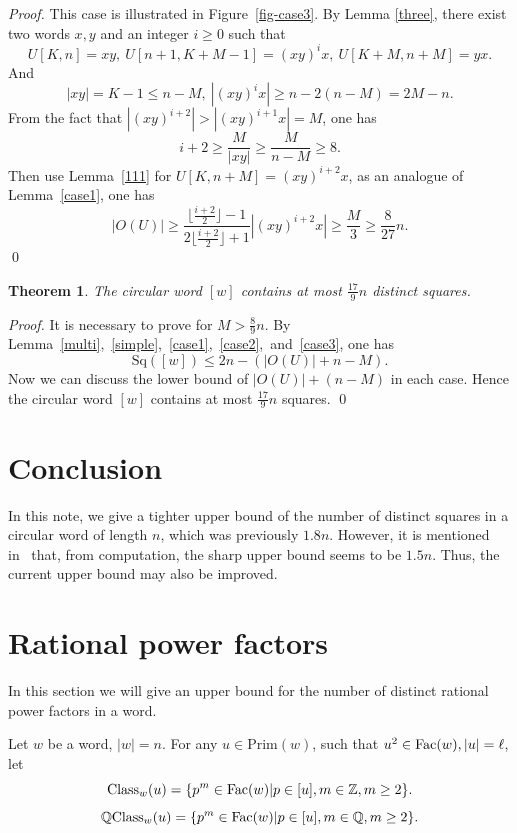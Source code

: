 \documentclass[runningheads,envcountsame,a4paper]{llncs}
\newtheorem{thm}{Theorem}
\newcommand{\fac}{\hbox{\rm Fac}}
\newcommand{\cl}{\mathrm{Class}}
\newcommand{\pri}{\mathrm{Prim}}
\newcommand{\sq}{\mathrm{Sq}}
\newcommand{\qcl}{\mathbb{Q}\mathrm{Class}}
\newcommand{\QQ}{\mathbb{Q}}
\newcommand{\ZZ}{\mathbb{Z}}
\begin{document}
\begin{proof}
This case is illustrated in Figure~\ref{fig-case3}. By Lemma \ref{three}, there exist two words $x,y$ and an integer $i \geq 0$ such that $$U[K,n]=xy,\ U[n+1,K+M-1]=(xy)^ix,\ U[K+M,n+M]=yx.$$ And
$$|xy|=K-1\le n-M,\ |(xy)^ix|\ge n-2(n-M)=2M-n.$$
From the fact that $|(xy)^{i+2}|> |(xy)^{i+1}x|= M$, one has 
$$i+2\ge \frac{M}{|xy|} \ge \frac{M}{n-M} \geq 8.$$
Then use Lemma~\ref{111} for $U[K,n+M]=(xy)^{i+2}x$, as an analogue of Lemma~\ref{case1}, one has
$$|O(U)|\ge \frac{\lfloor \frac {i+2}2 \rfloor-1}{2\lfloor \frac {i+2}2 \rfloor+1}|(xy)^{i+2}x|\geq\frac{M}{3}\ge\frac{8}{27}n.$$
\qed
\end{proof}

\begin{thm}
The circular word $[w]$ contains at most $\frac{17}{9}n$ distinct squares. 
\end{thm}

\begin{proof}
It is necessary to prove for $M>\frac89 n$.
By Lemma~\ref{multi},~\ref{simple},~\ref{case1},~\ref{case2},~and~\ref{case3}, one has $$\sq([w])\le 2n-(|O(U)|+n-M).$$
Now we can discuss the lower bound of $|O(U)|+(n-M)$ in each case. Hence the circular word $[w]$ contains at most $\frac{17}{9}n$ squares. \qed

\end{proof}

\fi

\section{Conclusion}

In this note, we give a tighter upper bound of the number of distinct squares in a circular word of length $n$, which was previously $1.8n$. However, it is mentioned in~\cite{AmitG17} that, from computation, the sharp upper bound seems to be $1.5n$. Thus, the current upper bound may also be improved. 





\iffalse
\section{Rational power factors}

In this section we will give an upper bound for the number of distinct rational power factors in a word. 

Let $w$ be a word, $|w|=n$. For any $u\in\pri(w)$, such that $u^2\in\fac(w),|u|=\ell$, let 
$$\cl_w(u)=\{ p^m\in\fac(w)| p\in[u],m\in\ZZ,m\ge 2\}.$$
$$\qcl_w(u)=\{ p^m\in\fac(w)| p\in[u],m\in\QQ,m\ge 2\}.$$
\end{document}
